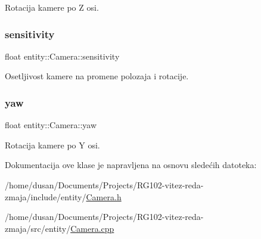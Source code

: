 Rotacija kamere po Z osi. 

\mbox{\label{classentity_1_1Camera_aae009950e0af66c4b5ed71f903b81513}} 
\subsubsection{\texorpdfstring{sensitivity}{sensitivity}}
{\footnotesize\ttfamily float entity\+::\+Camera\+::sensitivity\hspace{0.3cm}{\ttfamily [private]}}



Osetljivost kamere na promene polozaja i rotacije. 

\mbox{\label{classentity_1_1Camera_a2ebfeecc4fe70c880813f7a4671d8b63}} 
\subsubsection{\texorpdfstring{yaw}{yaw}}
{\footnotesize\ttfamily float entity\+::\+Camera\+::yaw\hspace{0.3cm}{\ttfamily [private]}}



Rotacija kamere po Y osi. 



Dokumentacija ove klase je napravljena na osnovu sledećih datoteka\+:\begin{DoxyCompactItemize}
\item 
/home/dusan/\+Documents/\+Projects/\+R\+G102-\/vitez-\/reda-\/zmaja/include/entity/\hyperlink{Camera_8h}{Camera.\+h}\item 
/home/dusan/\+Documents/\+Projects/\+R\+G102-\/vitez-\/reda-\/zmaja/src/entity/\hyperlink{Camera_8cpp}{Camera.\+cpp}\end{DoxyCompactItemize}
